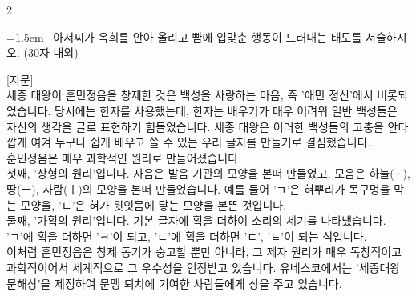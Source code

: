 \documentclass[11pt, a4paper]{article}
\begin{document}
\begin{multicols}{2}
\noindent\begin{minipage}{\columnwidth}
\vspace{2mm}
{\hangindent=1.5em  ~아저씨가 옥희를 안아 올리고 뺨에 입맞춘 행동이 드러내는 태도를 서술하시오. (30자 내외)\par}

\vspace{3mm}
\noindent\hrulefill
\vspace{2.5mm}
\noindent\hrulefill
\vspace{2.5mm}
\noindent\hrulefill
\vspace{2.5mm}
\noindent\hrulefill
\vspace{2.5mm}
\noindent\hrulefill
\vspace{2.5mm}
\vspace{1mm}
\vspace{4mm}
\end{minipage}
\par


\vspace{1mm}
\vspace{0.5mm}

\begin{passagebox}
\noindent{}[지문] \\
세종 대왕이 훈민정음을 창제한 것은 백성을 사랑하는 마음, 즉 '애민 정신'에서 비롯되었습니다. 당시에는 한자를 사용했는데, 한자는 배우기가 매우 어려워 일반 백성들은 자신의 생각을 글로 표현하기 힘들었습니다. 세종 대왕은 이러한 백성들의 고충을 안타깝게 여겨 누구나 쉽게 배우고 쓸 수 있는 우리 글자를 만들기로 결심했습니다.
\\[0.5em]
훈민정음은 매우 과학적인 원리로 만들어졌습니다. \\
첫째, '상형의 원리'입니다. 자음은 발음 기관의 모양을 본떠 만들었고, 모음은 하늘(·), 땅(ㅡ), 사람(ㅣ)의 모양을 본떠 만들었습니다. 예를 들어 'ㄱ'은 혀뿌리가 목구멍을 막는 모양을, 'ㄴ'은 혀가 윗잇몸에 닿는 모양을 본뜬 것입니다. \\
둘째, '가획의 원리'입니다. 기본 글자에 획을 더하여 소리의 세기를 나타냈습니다. 'ㄱ'에 획을 더하면 'ㅋ'이 되고, 'ㄴ'에 획을 더하면 'ㄷ', 'ㅌ'이 되는 식입니다.
\\[0.5em]
이처럼 훈민정음은 창제 동기가 숭고할 뿐만 아니라, 그 제자 원리가 매우 독창적이고 과학적이어서 세계적으로 그 우수성을 인정받고 있습니다. 유네스코에서는 '세종대왕 문해상'을 제정하여 문맹 퇴치에 기여한 사람들에게 상을 주고 있습니다.
\end{passagebox}
\vspace{1mm}


\end{multicols}
\end{document}
